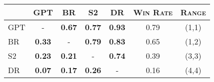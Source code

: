 \begin{tabular}{l|cccc|cc} 
\hline
\textsc{} & \textsc{GPT} &  \textsc{BR} &  \textsc{S2} & \textsc{DR} & \textsc{Win Rate}& \textsc{Range}\\
\hline 
\textsc{GPT} & -             & \textbf{0.67} & \textbf{0.77} & \textbf{0.93} & 0.79 & (1,1) \\
\textsc{BR} & \textbf{0.33} & -          & \textbf{0.79}    & \textbf{0.83} & 0.65 & (1,2)  \\
\textsc{S2} & \textbf{0.23} & \textbf{0.21} & -             & \textbf{0.74} & 0.39 & (3,3) \\
\textsc{DR} & \textbf{0.07} & \textbf{0.17} & \textbf{0.26} & -             & 0.16 & (4,4) \\
\end{tabular}